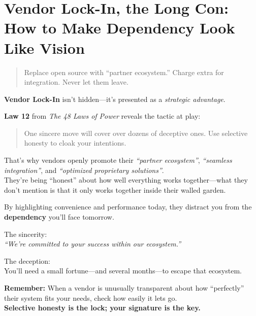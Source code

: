 \section{Vendor Lock-In, the Long Con: How to Make Dependency Look Like Vision}

\begin{quote}
Replace open source with “partner ecosystem.” Charge extra for integration. Never let them leave.
\end{quote}

  \textbf{Vendor Lock-In} isn’t hidden—it’s presented as a \textit{strategic advantage}.
  
  \medskip
  
  \textbf{Law 12} from \textit{The 48 Laws of Power} reveals the tactic at play:
  \begin{quote}
  One sincere move will cover over dozens of deceptive ones. Use selective honesty to cloak your intentions.
  \end{quote}
  
  \medskip
  
  That’s why vendors openly promote their \textit{``partner ecosystem''}, \textit{``seamless integration''}, and \textit{``optimized proprietary solutions''}. \\
  They’re being ``honest'' about how well everything works together—what they don’t mention is that it only works together inside their walled garden.
  
  \medskip
  
  By highlighting convenience and performance today, they distract you from the \textbf{dependency} you’ll face tomorrow.
  
  \medskip
  
  The sincerity: \\
  \textit{``We’re committed to your success within our ecosystem.''}
  
  \medskip
  
  The deception: \\
  You’ll need a small fortune—and several months—to escape that ecosystem.
  
  \medskip
  
  \textbf{Remember:} When a vendor is unusually transparent about how ``perfectly'' their system fits your needs, check how easily it lets go. \\
  \textbf{Selective honesty is the lock; your signature is the key.}
  
  





